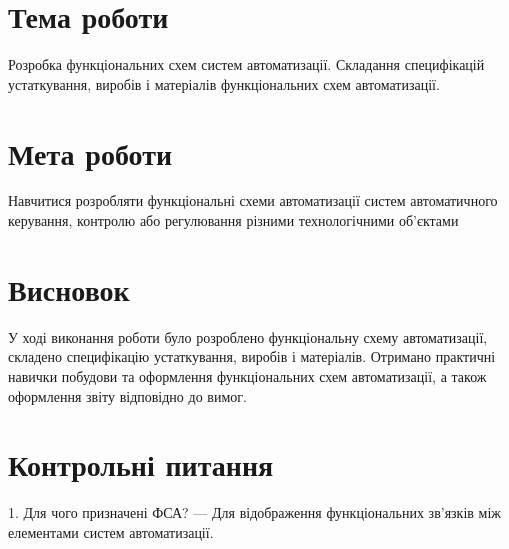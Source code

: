 \documentclass[a4paper]{article}
\begin{document}
\section*{Тема роботи}
Розробка функціональних схем систем автоматизації. Складання
специфікацій устаткування, виробів і матеріалів функціональних схем
автоматизації.

\section*{Мета роботи}
Навчитися розробляти функціональні схеми автоматизації
систем автоматичного керування, контролю або регулювання різними
технологічними об'єктами



\section*{Висновок}
У ході виконання роботи було розроблено функціональну схему автоматизації, складено специфікацію устаткування, виробів і матеріалів. Отримано практичні навички побудови та оформлення функціональних схем автоматизації, а також оформлення звіту відповідно до вимог.

\section*{Контрольні питання}
1. Для чого призначені ФСА? — Для відображення функціональних зв'язків між елементами систем автоматизації.  
\end{document}

